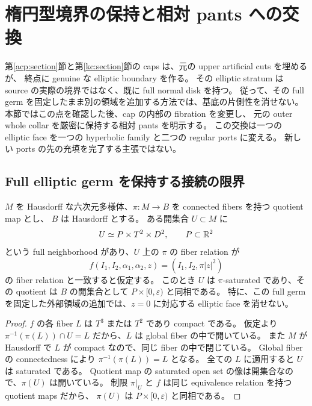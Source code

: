 \section{楕円型境界の保持と相対 pants への交換}
\label{eb:section}

第\ref{acp:section}節と第\ref{kc:section}節の caps は、元の upper artificial cuts を埋めるが、
終点に genuine な elliptic boundary を作る。
その elliptic stratum は source の実際の境界ではなく、既に full normal disk を持つ。
従って、その full germ を固定したまま別の領域を追加する方法では、基底の片側性を消せない。
本節ではこの点を確認した後、cap の内部の fibration を変更し、
元の outer whole collar を厳密に保持する相対 pants を明示する。
この交換は一つの elliptic face を一つの hyperbolic family と二つの regular ports に変える。
新しい ports の先の充填を完了する主張ではない。

\subsection{Full elliptic germ を保持する接続の限界}

\begin{proposition}\label{eb:persistence}
$M$ を Hausdorff な六次元多様体、$\pi:M\to B$ を connected fibers を持つ quotient map とし、
$B$ は Hausdorff とする。
ある開集合 $U\subset M$ に
\[
 U\simeq P\times T^2\times D^2,\qquad P\subset\mathbb R^2
\]
という full neighborhood があり、$U$ 上の $\pi$ の fiber relation が
\[
 f(I_1,I_2,\alpha_1,\alpha_2,z)
   =(I_1,I_2,\pi|z|^2)
\]
の fiber relation と一致すると仮定する。
このとき $U$ は $\pi$-saturated であり、その quotient は $B$ の開集合として
$P\times[0,\varepsilon)$ と同相である。
特に、この full germ を固定した外部領域の追加では、$z=0$ に対応する elliptic face を消せない。
\end{proposition}

\begin{proof}
$f$ の各 fiber $L$ は $T^3$ または $T^2$ であり compact である。
仮定より $\pi^{-1}(\pi(L))\cap U=L$ だから、$L$ は global fiber の中で開いている。
また $M$ が Hausdorff で $L$ が compact なので、同じ fiber の中で閉じている。
Global fiber の connectedness により $\pi^{-1}(\pi(L))=L$ となる。
全ての $L$ に適用すると $U$ は saturated である。
Quotient map の saturated open set の像は開集合なので、$\pi(U)$ は開いている。
制限 $\pi|_U$ と $f$ は同じ equivalence relation を持つ quotient maps だから、
$\pi(U)$ は $P\times[0,\varepsilon)$ と同相である。
\end{proof}

